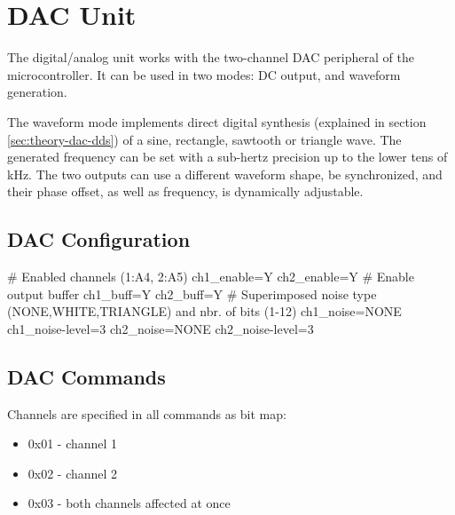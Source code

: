 \section{DAC Unit}

The digital/analog unit works with the two-channel DAC peripheral of the microcontroller. It can be used in two modes: DC output, and waveform generation.

The waveform mode implements direct digital synthesis (explained in section \ref{sec:theory-dac-dds}) of a sine, rectangle, sawtooth or triangle wave. The generated frequency can be set with a sub-hertz precision up to the lower tens of kHz. The two outputs can use a different waveform shape, be synchronized, and their phase offset, as well as frequency, is dynamically adjustable.


\subsection{DAC Configuration}

\begin{inicode}
# Enabled channels (1:A4, 2:A5)
ch1_enable=Y
ch2_enable=Y
# Enable output buffer
ch1_buff=Y
ch2_buff=Y
# Superimposed noise type (NONE,WHITE,TRIANGLE) and nbr. of bits (1-12)
ch1_noise=NONE
ch1_noise-level=3
ch2_noise=NONE
ch2_noise-level=3
\end{inicode}

\subsection{DAC Commands}

Channels are specified in all commands as bit map:

\begin{itemize}[nosep]
	\item 0x01 - channel 1
	\item 0x02 - channel 2
	\item 0x03 - both channels affected at once
\end{itemize}

